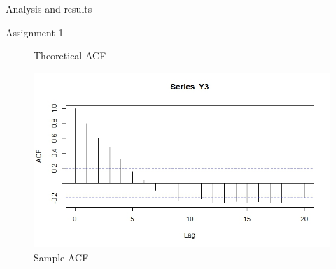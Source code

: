 \documentclass{article}
\begin{document}
\begin{section}{Analysis and results}
\begin{subsection}{Assignment 1}
\begin{figure}[ht!]
    \caption{Theoretical ACF}
    \label{fig:acf_theo}
\end{figure}
\begin{figure}[ht!]
    \centering
    \includegraphics[scale=0.4]{acfY3}
    \caption{Sample ACF}
    \label{fig:acf_sample}
\end{figure}
\end{subsection}


\end{section}
\end{document}
